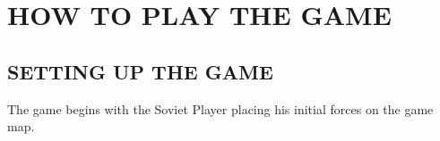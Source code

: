 \section{HOW TO PLAY THE GAME}

\subsection{SETTING UP THE GAME}

The game begins with the Soviet Player placing his initial forces on the game map.
